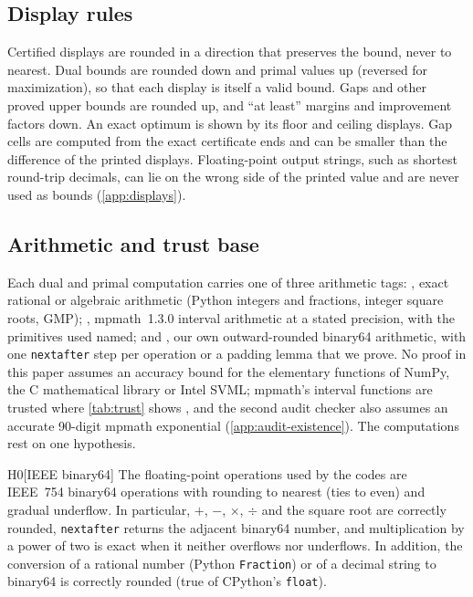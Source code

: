 \subsection{Display rules}\label{sec:semantics-display}

Certified displays are rounded in a direction that preserves the bound, never to nearest.
Dual bounds are rounded down and primal values up (reversed for maximization), so that each display is itself a valid bound.
Gaps and other proved upper bounds are rounded up, and ``at least'' margins and improvement factors down.
An exact optimum is shown by its floor and ceiling displays.
Gap cells are computed from the exact certificate ends and can be smaller than the difference of the printed displays.
Floating-point output strings, such as shortest round-trip decimals, can lie on the wrong side of the printed value and are never used as bounds (\cref{app:displays}).

\subsection{Arithmetic and trust base}\label{sec:semantics-trust}

Each dual and primal computation carries one of three arithmetic tags: , exact rational or algebraic arithmetic (Python integers and fractions, integer square roots, GMP); , mpmath~1.3.0 interval arithmetic at a stated precision, with the primitives used named; and , our own outward-rounded binary64 arithmetic, with one \texttt{nextafter} step per operation or a padding lemma that we prove.
No proof in this paper assumes an accuracy bound for the elementary functions of NumPy, the C mathematical library or Intel SVML; mpmath's interval functions are trusted where \cref{tab:trust} shows , and the second audit checker also assumes an accurate 90-digit mpmath exponential (\cref{app:audit-existence}).
The  computations rest on one hypothesis.

\begin{hypothesis}{H0}[IEEE binary64]\label{hyp:fp-ieee}
The floating-point operations used by the  codes are IEEE~754 binary64 operations with rounding to nearest (ties to even) and gradual underflow.
In particular, $+$, $-$, $\times$, $\div$ and the square root are correctly rounded, \texttt{nextafter} returns the adjacent binary64 number, and multiplication by a power of two is exact when it neither overflows nor underflows.
In addition, the conversion of a rational number (Python \texttt{Fraction}) or of a decimal string to binary64 is correctly rounded (true of CPython's \texttt{float}).
\end{hypothesis}

